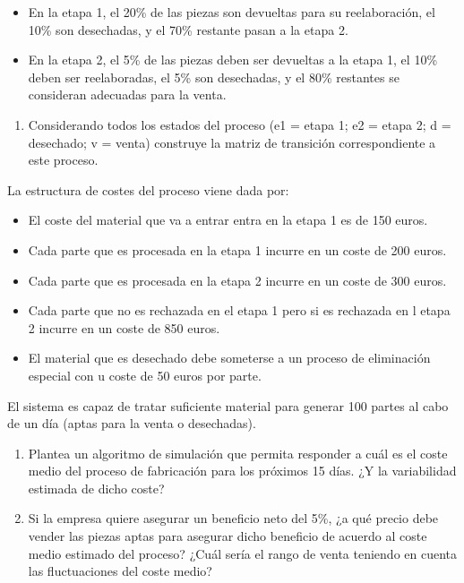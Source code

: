 \documentclass[
]{book}
\providecommand{\tightlist}{%
  \setlength{\itemsep}{0pt}\setlength{\parskip}{0pt}}
\theoremstyle{definition}
\theoremstyle{definition}
\theoremstyle{definition}
\theoremstyle{definition}
\theoremstyle{remark}
\begin{document}
\begin{itemize}
\tightlist
\item
  En la etapa 1, el 20\% de las piezas son devueltas para su reelaboración, el 10\% son desechadas, y el 70\% restante pasan a la etapa 2.
\item
  En la etapa 2, el 5\% de las piezas deben ser devueltas a la etapa 1, el 10\% deben ser reelaboradas, el 5\% son desechadas, y el 80\% restantes se consideran adecuadas para la venta.
\end{itemize}

\begin{enumerate}
\def\labelenumi{\arabic{enumi}.}
\tightlist
\item
  Considerando todos los estados del proceso (e1 = etapa 1; e2 = etapa 2; d = desechado; v = venta) construye la matriz de transición correspondiente a este proceso.
\end{enumerate}

La estructura de costes del proceso viene dada por:

\begin{itemize}
\tightlist
\item
  El coste del material que va a entrar entra en la etapa 1 es de 150 euros.
\item
  Cada parte que es procesada en la etapa 1 incurre en un coste de 200 euros.
\item
  Cada parte que es procesada en la etapa 2 incurre en un coste de 300 euros.
\item
  Cada parte que no es rechazada en el etapa 1 pero si es rechazada en l etapa 2 incurre en un coste de 850 euros.
\item
  El material que es desechado debe someterse a un proceso de eliminación especial con u coste de 50 euros por parte.
\end{itemize}

El sistema es capaz de tratar suficiente material para generar 100 partes al cabo de un día (aptas para la venta o desechadas).

\begin{enumerate}
\def\labelenumi{\arabic{enumi}.}
\setcounter{enumi}{1}
\tightlist
\item
  Plantea un algoritmo de simulación que permita responder a cuál es el coste medio del proceso de fabricación para los próximos 15 días. ¿Y la variabilidad estimada de dicho coste?
\item
  Si la empresa quiere asegurar un beneficio neto del 5\%, ¿a qué precio debe vender las piezas aptas para asegurar dicho beneficio de acuerdo al coste medio estimado del proceso? ¿Cuál sería el rango de venta teniendo en cuenta las fluctuaciones del coste medio?
\end{enumerate}
\end{document}

